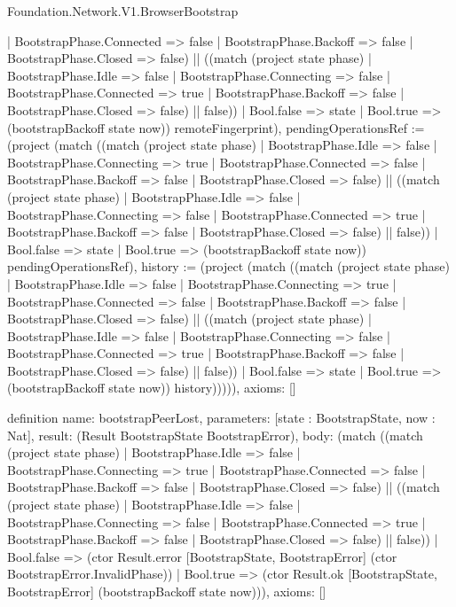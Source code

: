 \begin{lexlean}{Foundation.Network.V1.BrowserBootstrap}
\begin{semanticmodule}
{{          | BootstrapPhase.Connected => false
          | BootstrapPhase.Backoff => false
          | BootstrapPhase.Closed => false) || ((match (project state phase)
          | BootstrapPhase.Idle => false
          | BootstrapPhase.Connecting => false
          | BootstrapPhase.Connected => true
          | BootstrapPhase.Backoff => false
          | BootstrapPhase.Closed => false) || false))
        | Bool.false => state
        | Bool.true => (bootstrapBackoff state now)) remoteFingerprint), pendingOperationsRef := (project (match ((match (project state phase)
          | BootstrapPhase.Idle => false
          | BootstrapPhase.Connecting => true
          | BootstrapPhase.Connected => false
          | BootstrapPhase.Backoff => false
          | BootstrapPhase.Closed => false) || ((match (project state phase)
          | BootstrapPhase.Idle => false
          | BootstrapPhase.Connecting => false
          | BootstrapPhase.Connected => true
          | BootstrapPhase.Backoff => false
          | BootstrapPhase.Closed => false) || false))
        | Bool.false => state
        | Bool.true => (bootstrapBackoff state now)) pendingOperationsRef), history := (project (match ((match (project state phase)
          | BootstrapPhase.Idle => false
          | BootstrapPhase.Connecting => true
          | BootstrapPhase.Connected => false
          | BootstrapPhase.Backoff => false
          | BootstrapPhase.Closed => false) || ((match (project state phase)
          | BootstrapPhase.Idle => false
          | BootstrapPhase.Connecting => false
          | BootstrapPhase.Connected => true
          | BootstrapPhase.Backoff => false
          | BootstrapPhase.Closed => false) || false))
        | Bool.false => state
        | Bool.true => (bootstrapBackoff state now)) history)})))),
  axioms: []
}

definition{
  name: bootstrapPeerLost,
  parameters: [state : BootstrapState, now : Nat],
  result: (Result BootstrapState BootstrapError),
  body: (match ((match (project state phase)
      | BootstrapPhase.Idle => false
      | BootstrapPhase.Connecting => true
      | BootstrapPhase.Connected => false
      | BootstrapPhase.Backoff => false
      | BootstrapPhase.Closed => false) || ((match (project state phase)
      | BootstrapPhase.Idle => false
      | BootstrapPhase.Connecting => false
      | BootstrapPhase.Connected => true
      | BootstrapPhase.Backoff => false
      | BootstrapPhase.Closed => false) || false))
    | Bool.false => (ctor Result.error [BootstrapState, BootstrapError] (ctor BootstrapError.InvalidPhase))
    | Bool.true => (ctor Result.ok [BootstrapState, BootstrapError] (bootstrapBackoff state now))),
  axioms: []
}


\end{semanticmodule}
\end{lexlean}
